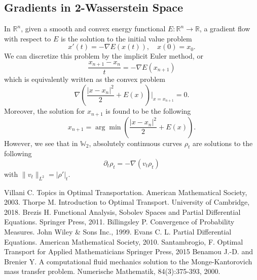 \documentclass[12pt]{article}
\newcommand{\R}{\mathbb{R}}
\theoremstyle{plain}
\numberwithin{equation}{section}
\begin{document}
\subsection{Gradients in 2-Wasserstein Space}
In $\R^n$, given a smooth and convex energy functional $E: \R^n\to \R$, a gradient flow with respect to $E$ is the solution to the initial value problem 
\[x'(t) = -\nabla E(x(t)),\quad x(0) = x_0.\]
We can discretize this problem by the implicit Euler method, or 
\[\frac{x_{n+1}-x_n}{t} = - \nabla E(x_{n+1})\]
which is equivalently written as the convex problem 
\[\nabla\left(\frac{|x-x_n|^2}{2} + E(x)\right)\bigg\vert_{x=x_{n+1}} = 0.\]
Moreover, the solution for $x_{n+1}$ is found to be the following
\[x_{n+1} = \arg\min\left(\frac{|x-x_n|^2}{2} + E(x)\right).\]
However, we see that in $\mathbb{W}_2$, absolutely continuous curves $\rho_t$ are solutions to the following 
\[\partial_t \rho_t = -\nabla(v_t\rho_t) \]
with $\|v_t\|_{L^2} = |\rho'|_t$.
\begin{thebibliography}{9}
Villani C.
Topics in Optimal Transportation.
American Mathematical Society, 2003.
Thorpe M.
Introduction to Optimal Transport.
University of Cambridge, 2018.
Brezis H.
Functional Analysis, Sobolev Spaces and Partial Differential Equations. 
Springer Press, 2011.
Billingsley P.
Convergence of Probability Measures.
John Wiley \& Sons Inc., 1999.
Evans C. L.
Partial Differential Equations.
American Mathematical Society, 2010.
Santambrogio, F.
Optimal Transport for Applied Mathematicians
Springer Press, 2015
Benamou J.-D. and Brenier Y. 
A computational fluid mechanics solution to the Monge-Kantorovich mass transfer problem.
Numerische Mathematik, 84(3):375-393, 2000.
\end{thebibliography}
\end{document}
